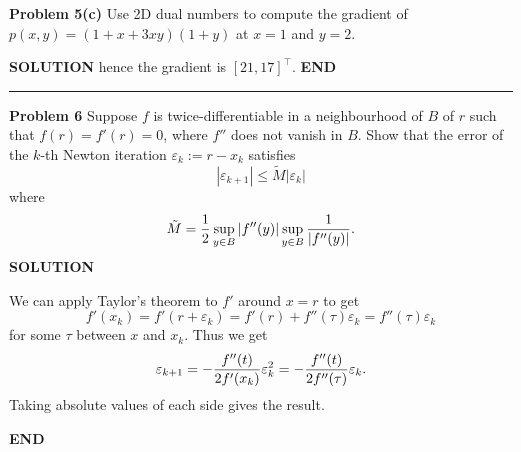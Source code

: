 \documentclass[12pt,a4paper]{article}
\begin{document}
\textbf{Problem 5(c)} Use 2D dual numbers to compute the gradient of $p(x,y) = (1 + x + 3xy)(1+y)$ at $x=1$ and $y=2$.

\textbf{SOLUTION}
hence the gradient is $[21,17]^\ensuremath{\top}$. \textbf{END}

\rule{\textwidth}{1pt}
\textbf{Problem 6} Suppose $f$ is twice-differentiable in a neighbourhood of $B$ of $r$ such that $f(r) = f'(r) = 0$, where $f''$ does not vanish in $B$. Show  that the error of the $k$-th Newton iteration $\ensuremath{\varepsilon}_k := r - x_k$ satisfies
\[
|\ensuremath{\varepsilon}_{k+1}| \ensuremath{\leq} \tilde{M} |\ensuremath{\varepsilon}_k|
\]
where 
\[
\tilde{M} ={1 \over 2} \sup_{y \in B} |f''(y)|  \sup_{y \in B} {1 \over |f''(y)|}.
\]
\textbf{SOLUTION}

We can apply Taylor's theorem to $f'$ around $x = r$ to get
\[
f'(x_k) = f'(r + \ensuremath{\varepsilon}_k) = f'(r) + f''(\ensuremath{\tau}) \ensuremath{\varepsilon}_k = f''(\ensuremath{\tau}) \ensuremath{\varepsilon}_k
\]
for some $\ensuremath{\tau}$ between $x$ and $x_k$.  Thus we get
\[
\ensuremath{\varepsilon}_{k+1}  = -{f''(t) \over 2f'(x_k)} \ensuremath{\varepsilon}_k^2 = -{f''(t) \over 2f''(\ensuremath{\tau})} \ensuremath{\varepsilon}_k.
\]
Taking absolute values of each side gives the result.

\textbf{END}
\end{document}
